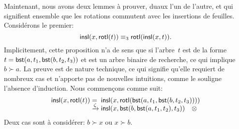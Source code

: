 \bigskip

Maintenant, nous avons deux lemmes à prouver, duaux l'un de l'autre,
et qui signifient ensemble que les rotations commutent avec
les insertions de feuilles. Considérons le premier:
\begin{equation*}
\textsf{insl}(x,\textsf{rotl}(t)) \equiv_3 \textsf{rotl}(\textsf{insl}(x,t)).
\end{equation*}
Implicitement, cette proposition n'a de sens que si l'arbre~\(t\) est
de la forme \(t=\textsf{bst}(a, t_1, \textsf{bst}(b,t_2,t_3))\) et est un
arbre binaire de recherche, ce qui implique \(b \succ a\). La preuve
est de nature technique, ce qui signifie qu'elle requiert de nombreux
cas et n'apporte pas de nouvelles intuitions, comme le souligne
l'absence d'induction. Nous commençons comme suit:
\begin{equation*}
\begin{array}{@{}r@{\;}l@{\;}l@{}}
  \fun{insl}(x,\fun{rotl}(t))
& = & \fun{insl}(x,\fun{rotl}(\fun{bst}(a, t_1,
\fun{bst}(b,t_2,t_3))))\\
& \xrightarrow{\smash{\zeta}} &
\fun{insl}(x,\fun{bst}(b,\fun{bst}(a,t_1,t_2),t_3)) \quad \otimes
\end{array}
\end{equation*}
Deux cas sont à considérer: \(b \succ x\) ou \(x \succ b\).
